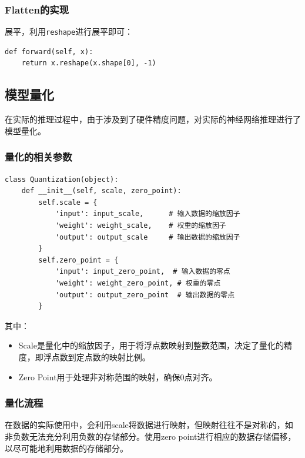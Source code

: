\documentclass[12pt,a4paper]{article}
\begin{document}
\subsubsection{Flatten的实现}

展平，利用\texttt{reshape}进行展平即可：

\begin{lstlisting}
def forward(self, x):
    return x.reshape(x.shape[0], -1)
\end{lstlisting}

\subsection{模型量化}

在实际的推理过程中，由于涉及到了硬件精度问题，对实际的神经网络推理进行了模型量化。

\subsubsection{量化的相关参数}

\begin{lstlisting}
class Quantization(object):
    def __init__(self, scale, zero_point):
        self.scale = {
            'input': input_scale,      # 输入数据的缩放因子
            'weight': weight_scale,    # 权重的缩放因子
            'output': output_scale     # 输出数据的缩放因子
        }
        self.zero_point = {
            'input': input_zero_point,  # 输入数据的零点
            'weight': weight_zero_point, # 权重的零点
            'output': output_zero_point  # 输出数据的零点
        }
\end{lstlisting}

其中：

\begin{itemize}
\item
  Scale是量化中的缩放因子，用于将浮点数映射到整数范围，决定了量化的精度，即浮点数到定点数的映射比例。
\item
  Zero Point用于处理非对称范围的映射，确保0点对齐。
\end{itemize}

\subsubsection{量化流程}

在数据的实际使用中，会利用scale将数据进行映射，但映射往往不是对称的，如非负数无法充分利用负数的存储部分。使用zero
point进行相应的数据存储偏移，以尽可能地利用数据的存储部分。
\end{document}
